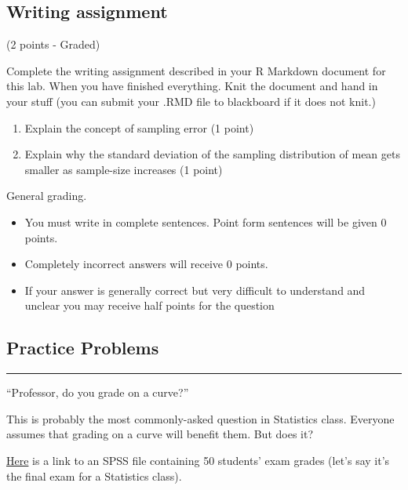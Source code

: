 \documentclass[
]{book}
\providecommand{\tightlist}{%
  \setlength{\itemsep}{0pt}\setlength{\parskip}{0pt}}
\begin{document}
\hypertarget{writing-assignment-3}{%
\subsection{Writing assignment}\label{writing-assignment-3}}

(2 points - Graded)

Complete the writing assignment described in your R Markdown document
for this lab. When you have finished everything. Knit the document and
hand in your stuff (you can submit your .RMD file to blackboard if it
does not knit.)

\begin{enumerate}
\def\labelenumi{\arabic{enumi}.}
\item
  Explain the concept of sampling error (1 point)
\item
  Explain why the standard deviation of the sampling distribution of
  mean gets smaller as sample-size increases (1 point)
\end{enumerate}

General grading.

\begin{itemize}
\tightlist
\item
  You must write in complete sentences. Point form sentences will be
  given 0 points.
\item
  Completely incorrect answers will receive 0 points.
\item
  If your answer is generally correct but very difficult to understand
  and unclear you may receive half points for the question
\end{itemize}

\hypertarget{practice-problems-2}{%
\subsection{Practice Problems}\label{practice-problems-2}}

\begin{center}\rule{0.5\linewidth}{0.5pt}\end{center}

``Professor, do you grade on a curve?''

This is probably the most commonly-asked question in Statistics class.
Everyone assumes that grading on a curve will benefit them. But does it?

\href{https://github.com/CrumpLab/statisticsLab/blob/master/data/spssdata/StatsGrades.sav}{Here}
is a link to an SPSS file containing 50 students' exam grades (let's say
it's the final exam for a Statistics class).
\end{document}

